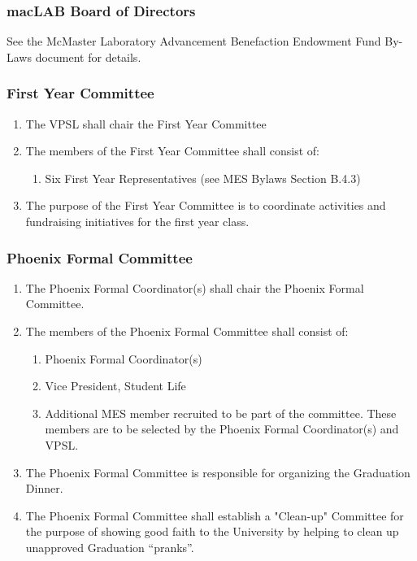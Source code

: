 \subsubsection{macLAB Board of Directors}
\label{maclab-board-of-directors}
See the McMaster Laboratory Advancement Benefaction Endowment Fund
By-Laws document for details.

\subsubsection{First Year Committee}
\label{first-year-committee}

\begin{enumerate}
 \item
  The VPSL shall chair the First Year Committee
 \item
  The members of the First Year Committee shall consist of:

  \begin{enumerate}
   \item
    Six First Year Representatives (see MES Bylaws Section B.4.3)
  \end{enumerate}
 \item
  The purpose of the First Year Committee is to coordinate activities and fundraising initiatives for the first year class.
\end{enumerate}

\subsubsection{Phoenix Formal Committee}
\label{phoenix-formal-committee}
\begin{enumerate}
 \item
  The Phoenix Formal Coordinator(s) shall chair the Phoenix Formal Committee.
 \item
  The members of the Phoenix Formal Committee shall consist of:

  \begin{enumerate}
   \item
    Phoenix Formal Coordinator(s) 
   \item
    Vice President, Student Life
   \item    
    Additional MES member recruited to be part of the committee. These members are to be selected by the Phoenix Formal Coordinator(s) and VPSL. 
  \end{enumerate}
 \item
  The Phoenix Formal Committee is responsible for organizing the Graduation Dinner.
 \item
  The Phoenix Formal Committee shall establish a "Clean-up" Committee for the purpose of showing good faith to the University by helping to clean up unapproved Graduation ``pranks''. 

\end{enumerate}


